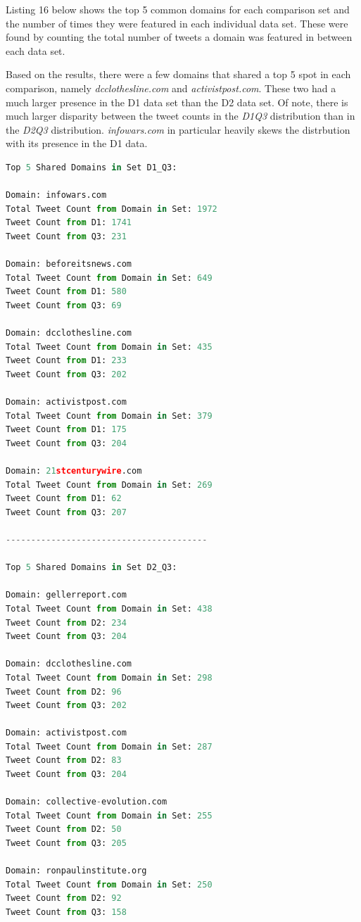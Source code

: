 \documentclass[12pt]{article}
\begin{document}


Listing 16 below shows the top 5 common domains for each comparison set and the number of times they were featured in each individual data set. These were found by counting the total number of tweets a domain was featured in between each data set. 

\par Based on the results, there were a few domains that shared a top 5 spot in each comparison, namely \emph{dcclothesline.com} and \emph{activistpost.com}. These two had a much larger presence in the D1 data set than the D2 data set. Of note, there is much larger disparity between the tweet counts in the \emph{D1\textunderscore Q3} distribution than in the \emph{D2\textunderscore Q3} distribution. \emph{infowars.com} in particular heavily skews the distrbution with its presence in the D1 data.

\begin{lstlisting}[language=Python, caption={Top 5 domains per data set comparison}, label=lst:copy]
Top 5 Shared Domains in Set D1_Q3:

Domain: infowars.com
Total Tweet Count from Domain in Set: 1972
Tweet Count from D1: 1741
Tweet Count from Q3: 231

Domain: beforeitsnews.com
Total Tweet Count from Domain in Set: 649
Tweet Count from D1: 580
Tweet Count from Q3: 69

Domain: dcclothesline.com
Total Tweet Count from Domain in Set: 435
Tweet Count from D1: 233
Tweet Count from Q3: 202

Domain: activistpost.com
Total Tweet Count from Domain in Set: 379
Tweet Count from D1: 175
Tweet Count from Q3: 204

Domain: 21stcenturywire.com
Total Tweet Count from Domain in Set: 269
Tweet Count from D1: 62
Tweet Count from Q3: 207

----------------------------------------

Top 5 Shared Domains in Set D2_Q3:

Domain: gellerreport.com
Total Tweet Count from Domain in Set: 438
Tweet Count from D2: 234
Tweet Count from Q3: 204

Domain: dcclothesline.com
Total Tweet Count from Domain in Set: 298
Tweet Count from D2: 96
Tweet Count from Q3: 202

Domain: activistpost.com
Total Tweet Count from Domain in Set: 287
Tweet Count from D2: 83
Tweet Count from Q3: 204

Domain: collective-evolution.com
Total Tweet Count from Domain in Set: 255
Tweet Count from D2: 50
Tweet Count from Q3: 205

Domain: ronpaulinstitute.org
Total Tweet Count from Domain in Set: 250
Tweet Count from D2: 92
Tweet Count from Q3: 158
\end{lstlisting}
\end{document}
